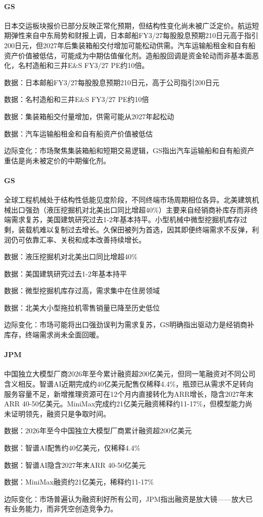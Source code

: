 \documentclass[11pt]{ctexart}
\begin{document}
\paragraph{GS} 日本交运板块报价已部分反映正常化预期，但结构性变化尚未被广泛定价。航运短期弹性来自中东局势和财报上调，日本邮船FY3/27每股股息预期210日元高于指引200日元，但2027年后集装箱船交付增加可能松动供需。汽车运输船租金和自有船资产价值被低估，可能成为中期估值催化剂。造船股回调是资金轮动而非基本面恶化，名村造船和三井E\&S FY3/27 PE约10倍。
{\small\color{refgray}数据：日本邮船FY3/27每股股息预期210日元，高于公司指引200日元\par}
{\small\color{refgray}数据：名村造船和三井E\&S FY3/27 PE约10倍\par}
{\small\color{refgray}数据：集装箱船交付量增加，供需可能从2027年起松动\par}
{\small\color{refgray}数据：汽车运输船租金和自有船资产价值被低估\par}
{\small\color{refgray}边际变化：市场聚焦集装箱船和短期交易逻辑，GS指出汽车运输船和自有船资产重估是尚未被定价的中期催化剂。\par}
\paragraph{GS} 全球工程机械处于结构性低能见度阶段，不同终端市场周期相位各异。北美建筑机械出口强劲（液压挖掘机对北美出口同比增超40\%）主要来自经销商补库存而非终端需求复苏，美国建筑研究过去1-2年基本持平。小型机械中微型挖掘机库存过剩，装载机难以复制过去增长。久保田被列为首选，因其即便终端需求不反弹，利润仍可依靠汇率、关税和成本改善持续增长。
{\small\color{refgray}数据：液压挖掘机对北美出口同比增超40\%\par}
{\small\color{refgray}数据：美国建筑研究过去1-2年基本持平\par}
{\small\color{refgray}数据：微型挖掘机库存过高，需求集中在住房领域\par}
{\small\color{refgray}数据：北美大小型拖拉机零售销量已降至历史低位\par}
{\small\color{refgray}边际变化：市场可能将出口强劲误判为需求复苏，GS明确指出驱动力是经销商补库存，终端需求尚未全面回暖。\par}
\paragraph{JPM} 中国独立大模型厂商2026年至今累计融资超200亿美元，但同一笔融资对不同公司含义相反。智谱AI近期完成约40亿美元配售仅稀释4.4\%，瓶颈已从需求不足转向服务容量不足，新增推理资源可在12个月内直接转化为ARR增长，隐含2027年末ARR 40-50亿美元。MiniMax完成约21亿美元融资稀释约11-17\%，但模型能力尚未证明领先，融资只是争取时间。
{\small\color{refgray}数据：2026年至今中国独立大模型厂商累计融资超200亿美元\par}
{\small\color{refgray}数据：智谱AI配售约40亿美元，仅稀释4.4\%\par}
{\small\color{refgray}数据：智谱AI隐含2027年末ARR 40-50亿美元\par}
{\small\color{refgray}数据：MiniMax融资约21亿美元，稀释约11-17\%\par}
{\small\color{refgray}边际变化：市场普遍认为融资利好所有公司，JPM指出融资是放大镜——放大已有业务能力，而非凭空创造竞争力。\par}
\end{document}
